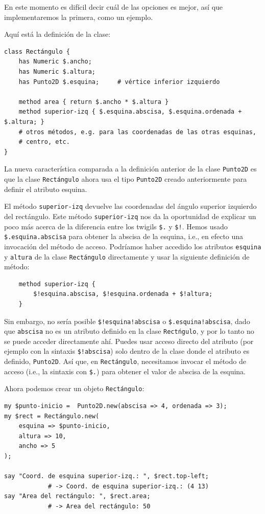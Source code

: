 En este momento es difícil decir cuál de las opciones es mejor, 
así que implementaremos la primera, como un ejemplo.

Aquí está la definición de la clase:

\begin{verbatim}
class Rectángulo {
    has Numeric $.ancho;
    has Numeric $.altura;
    has Punto2D $.esquina;     # vértice inferior izquierdo 

    method area { return $.ancho * $.altura }
    method superior-izq { $.esquina.abscisa, $.esquina.ordenada + $.altura; }
    # otros métodos, e.g. para las coordenadas de las otras esquinas,
    # centro, etc.
}
\end{verbatim}
%
La nueva característica comparada a la definición 
anterior de la clase {\tt Punto2D} es que la clase 
\verb|Rectángulo| ahora usa el tipo {\tt Punto2D} 
creado anteriormente para definir el atributo esquina.

El método {\tt superior-izq} devuelve las coordenadas 
del ángulo superior izquierdo del rectángulo. Este 
método {\tt superior-izq} nos da la oportunidad de explicar
un poco más acerca de la diferencia entre los twigils
\verb|$.| y \verb|$!|. Hemos usado \verb|$.esquina.abscisa|
para obtener la abscisa de la esquina, i.e., en efecto una
invocación del método de acceso. Podríamos haber accedido 
los atributos {\tt esquina} y {\tt altura} de la clase
{\tt Rectángulo} directamente y usar la siguiente definición
de método:

\begin{verbatim}
    method superior-izq { 
    	$!esquina.abscisa, $!esquina.ordenada + $!altura;
    }
\end{verbatim}

Sin embargo, no sería posible \verb|$!esquina!abscisa| o 
\verb|$.esquina!abscisa|, dado que {\tt abscisa} no es un 
atributo definido en la clase {\tt Rectńgulo}, y por lo tanto
no se puede acceder directamente ahí. Puedes usar acceso directo
del atributo (por ejemplo con la sintaxis \verb|$!abscisa|)
solo dentro de la clase donde el atributo es definido, {\tt Punto2D}.
Así que, en {\tt Rectángulo}, necesitamos invocar el método de
acceso (i.e., la sintaxis con \verb|$.|) para obtener el valor
de abscisa de la esquina. 

Ahora podemos crear un objeto {\tt Rectángulo}:

\begin{verbatim}
my $punto-inicio =  Punto2D.new(abscisa => 4, ordenada => 3);
my $rect = Rectángulo.new(
	esquina => $punto-inicio, 
	altura => 10, 
	ancho => 5
);

say "Coord. de esquina superior-izq.: ", $rect.top-left;   
			# -> Coord. de esquina superior-izq.: (4 13)
say "Area del rectángulo: ", $rect.area;      
			# -> Area del rectángulo: 50
\end{verbatim}


